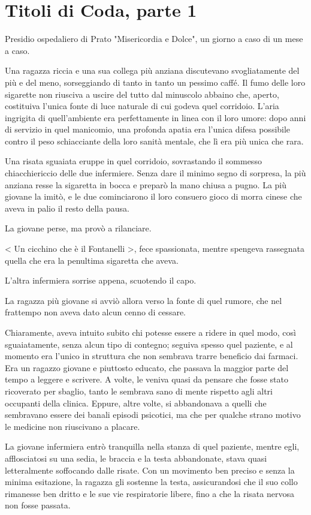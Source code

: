\chapter{Titoli di Coda, parte 1}

Presidio ospedaliero di Prato "Misericordia e Dolce", un giorno a caso di un mese a caso.

Una ragazza riccia e una sua collega più anziana discutevano svogliatamente del più e del meno, sorseggiando di tanto in tanto un pessimo caffé. Il fumo delle loro sigarette non riusciva a uscire del tutto dal minuscolo abbaino che, aperto, costituiva l'unica fonte di luce naturale di cui godeva quel corridoio. L'aria ingrigita di quell'ambiente era perfettamente in linea con il loro umore: dopo anni di servizio in quel manicomio, una profonda apatia era l'unica difesa possibile contro il peso schiacciante della loro sanità mentale, che lì era più unica che rara.

Una risata sguaiata eruppe in quel corridoio, sovrastando il sommesso chiacchiericcio delle due infermiere. Senza dare il minimo segno di sorpresa, la più anziana resse la sigaretta in bocca e preparò la mano chiusa a pugno. La più giovane la imitò, e le due cominciarono il loro consuero gioco di morra cinese che aveva in palio il resto della pausa.

La giovane perse, ma provò a rilanciare.

< Un cicchino che è il Fontanelli >, fece spassionata, mentre spengeva rassegnata quella che era la penultima sigaretta che aveva.

L'altra infermiera sorrise appena, scuotendo il capo.

La ragazza più giovane si avviò allora verso la fonte di quel rumore, che nel frattempo non aveva dato alcun cenno di cessare. 

Chiaramente, aveva intuito subito chi potesse essere a ridere in quel modo, così sguaiatamente, senza alcun tipo di contegno; seguiva spesso quel paziente, e al momento era l'unico in struttura che non sembrava trarre beneficio dai farmaci. Era un ragazzo giovane e piuttosto educato, che passava la maggior parte del tempo a leggere e scrivere. A volte, le veniva quasi da pensare che fosse stato ricoverato per sbaglio, tanto le sembrava sano di mente rispetto agli altri occupanti della clinica. Eppure, altre volte, si abbandonava a quelli che sembravano essere dei banali episodi psicotici, ma che per qualche strano motivo le medicine non riuscivano a placare.

La giovane infermiera entrò tranquilla nella stanza di quel paziente, mentre egli, afflosciatosi su una sedia, le braccia e la testa abbandonate, stava quasi letteralmente soffocando dalle risate. Con un movimento ben preciso e senza la minima esitazione, la ragazza gli sostenne la testa, assicurandosi che il suo collo rimanesse ben dritto e le sue vie respiratorie libere, fino a che la risata nervosa non fosse passata.


